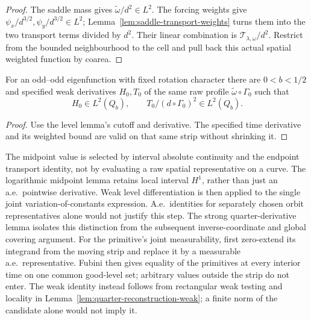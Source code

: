 \begin{proof}
\leanok
The saddle mass gives $\widetilde\omega/d^2\in L^2$.
The forcing weights give $\psi_x/d^{3/2},\psi_y/d^{3/2}\in L^2$;
Lemma~\ref{lem:saddle-transport-weights} turns them into the two
transport terms divided by $d^2$.
Their linear combination is $\mathcal T_{\lambda,\omega}/d^2$.
Restrict from the bounded neighbourhood to the cell and pull back
this actual spatial weighted function by coarea.
\end{proof}

\begin{lemma}
\label{lem:dd-base-quarter-weighted-derivatives}
\leanok
For an odd--odd eigenfunction with fixed rotation character there are
$0<b<1/2$ and specified weak derivatives $H_0,T_0$ of the same raw
profile $\widetilde\omega\circ\Gamma_0$ such that
\[
 H_0\in L^2(Q_b),\qquad T_0/(d\circ\Gamma_0)^2\in L^2(Q_b).
\]
\end{lemma}

\begin{proof}
\leanok
Use the level lemma's cutoff and derivative.
The specified time derivative and its weighted bound are valid on
that same strip without shrinking it.
\end{proof}

\begin{remark}
The midpoint value is selected by interval absolute continuity and the
endpoint transport identity, not by evaluating a raw spatial representative
on a curve. The logarithmic midpoint lemma retains local interval $H^1$,
rather than just an a.e.\ pointwise derivative.
Weak level differentiation is then applied to the single joint
variation-of-constants expression. A.e.\ identities for separately chosen
orbit representatives alone would not justify this step.
The strong quarter-derivative lemma isolates this distinction from the
subsequent inverse-coordinate and global covering argument.
For the primitive's joint measurability, first zero-extend its integrand
from the moving strip and replace it by a measurable a.e.\ representative.
Fubini then gives equality of the primitives at every interior time on
one common good-level set; arbitrary values outside the strip do not enter.
The weak identity instead follows from rectangular weak testing and
locality in Lemma~\ref{lem:quarter-reconstruction-weak}; a finite norm of
the candidate alone would not imply it.
\end{remark}

